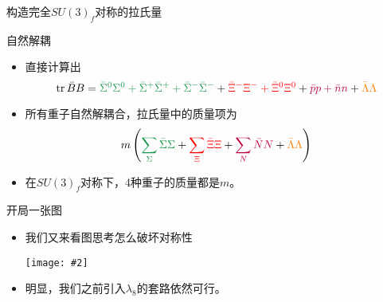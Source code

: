 \documentclass[aspectratio=1610,14pt,mathserif]{beamer}
\DeclareMathOperator{\tr}{tr}
\newcommand{\lag}{\mathcal{L}}
\newcommand{\mat}[1]{\begin{pmatrix}#1\end{pmatrix}}
\newcommand{\red}[1]{{\color{red} #1}}
\def\green#1{{\color[rgb]{0.1,0.6,0.3}#1}}
\newcommand{\purple}[1]{{\color{purple} #1}}
\newcommand{\orange}[1]{{\color{orange} #1}}
\newcommand{\cpic}[2]{
\begin{center}
\texttt{[image: \#2]}
\end{center}
}
\begin{document}
\begin{frame}{构造完全$SU(3)_f$对称的拉氏量}
\end{frame}

\begin{frame}{自然解耦}
\begin{itemize}
\item 直接计算出
$$
\tr \bar B B =\green{ \bar \Sigma^0 \Sigma^0 + \bar \Sigma^+ \bar \Sigma^+ + \bar \Sigma^- \bar \Sigma^- }+\red{ \bar \Xi^- \Xi^- + \bar \Xi^0 \Xi^0} +\purple{ \bar p p + \bar n n }+\orange{ \bar \Lambda \Lambda}
$$
\item 所有重子自然解耦合，拉氏量中的质量项为
$$
m\left(\green{\sum_\Sigma \bar \Sigma \Sigma }+\red{ \sum_\Xi \bar \Xi \Xi}+\purple{\sum_N \bar N N }+\orange{\bar \Lambda \Lambda} \right)
$$
\item 在$SU(3)_f$对称下，4种重子的质量都是$m$。
\end{itemize}
\end{frame}

\begin{frame}{开局一张图}
\begin{itemize}
\item 我们又来看图思考怎么破坏对称性
\cpic{0.18}{bayons}
\item 明显，我们之前引入$\lambda_8$的套路依然可行。
\end{itemize}
\end{frame}
\end{document}
